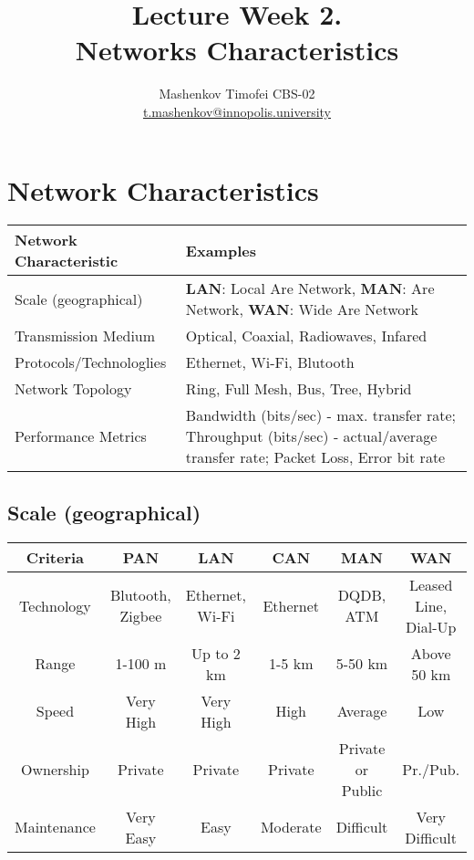 \documentclass{article}
\title{Lecture Week 2.\\ Networks Characteristics}
\author{Mashenkov Timofei CBS-02 \\ \href{mailto:t.mashenkov@innopolis.university}{t.mashenkov@innopolis.university}}
\begin{document}
\maketitle{}

\section*{Network Characteristics}

\begin{table}[H]
	\centering
	\begin{tabular}{|l|p{8cm}|}
		\toprule
		Network Characteristic  & Examples                                   \\ \midrule
		Scale (geographical)    & \textbf{LAN}: Local Are Network,
		\newline \textbf{MAN}: Are Network,
		\newline \textbf{WAN}: Wide Are Network                              \\
		\hline
		Transmission Medium     & Optical, Coaxial, Radiowaves, Infared      \\
		\hline
		Protocols/Technologlies & Ethernet, Wi-Fi, Blutooth                  \\
		\hline
		Network Topology        & Ring, Full Mesh, Bus, Tree, Hybrid         \\
		\hline
		Performance Metrics     & Bandwidth (bits/sec) - max. transfer rate;
		\newline Throughput (bits/sec) - actual/average transfer rate;
		\newline Packet Loss, Error bit rate                                 \\
		\bottomrule
	\end{tabular}
\end{table}

\subsection*{Scale (geographical)}

\begin{table}[H]
	\centering
	\begin{tabular}{|c|c|c|c|c|c|}
		\toprule
		Criteria    & PAN              & LAN             & CAN      & MAN               & WAN                  \\ \midrule
		Technology  & Blutooth, Zigbee & Ethernet, Wi-Fi & Ethernet & DQDB, ATM         & Leased Line, Dial-Up \\
		Range       & 1-100 m          & Up to 2 km      & 1-5 km   & 5-50 km           & Above 50 km          \\
		Speed       & Very High        & Very High       & High     & Average           & Low                  \\
		Ownership   & Private          & Private         & Private  & Private or Public & Pr./Pub.             \\
		Maintenance & Very Easy        & Easy            & Moderate & Difficult         & Very Difficult       \\
		\bottomrule
	\end{tabular}
\end{table}
\end{document}
